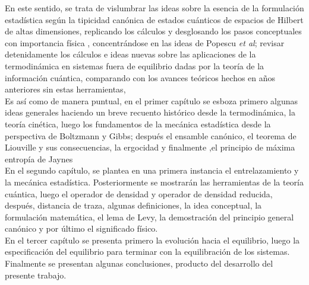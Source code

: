 En este sentido, se trata de vislumbrar las ideas sobre la esencia de la formulación estadística según la tipicidad canónica de estados cuánticos de espacios  de Hilbert  de altas dimensiones, replicando los cálculos y desglosando los pasos conceptuales con importancia física , concentrándose en las ideas de Popescu \textit{et al}; revisar detenidamente los cálculos e ideas nuevas  sobre las aplicaciones de la termodinámica en sistemas fuera de equilibrio dadas por la teoría de la información cuántica, comparando con los avances teóricos  hechos en años anteriores  sin estas herramientas,
\\
Es así como de manera puntual, en el primer capítulo se esboza primero algunas ideas generales haciendo un breve recuento histórico desde la termodinámica, la teoría cinética, luego los fundamentos de la mecánica estadística desde la perspectiva de Boltzmann y Gibbs; después  el ensamble canónico, el teorema de Liouville  y sus consecuencias, la ergocidad  y finalmente ,el principio de máxima entropía de Jaynes     
\\
En el segundo capítulo, se plantea en una primera instancia el entrelazamiento y la mecánica estadística. Posteriormente se mostrarán las herramientas de la teoría cuántica, luego el operador de densidad y operador de densidad reducida, después, distancia de traza, algunas definiciones, la idea conceptual, la formulación matemática, el lema de Levy, la demostración del principio general canónico y por último el significado físico.
\\
En el tercer capítulo se presenta primero la evolución hacia el equilibrio, luego la especificación del equilibrio para terminar con la equilibración de los sistemas.
\\
Finalmente se presentan algunas conclusiones, producto del desarrollo del presente trabajo. 

